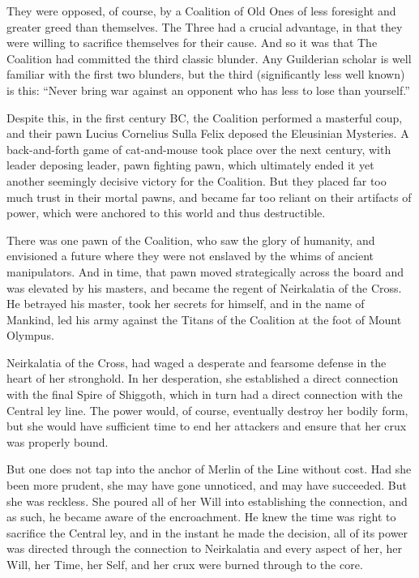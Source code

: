 They were opposed, of course, by a Coalition of Old Ones of less foresight and greater greed than themselves. The Three had a crucial advantage, in that they were willing to sacrifice themselves for their cause. And so it was that The Coalition had committed the third classic blunder. Any Guilderian scholar is well familiar with the first two blunders, but the third (significantly less well known) is this: “Never bring war against an opponent who has less to lose than yourself.”

Despite this, in the first century BC, the Coalition performed a masterful coup, and their pawn Lucius Cornelius Sulla Felix deposed the Eleusinian Mysteries. A back-and-forth game of cat-and-mouse took place over the next century, with leader deposing leader, pawn fighting pawn, which ultimately ended it yet another seemingly decisive victory for the Coalition. But they placed far too much trust in their mortal pawns, and became far too reliant on their artifacts of power, which were anchored to this world and thus destructible.

There was one pawn of the Coalition, who saw the glory of humanity, and envisioned a future where they were not enslaved by the whims of ancient manipulators. And in time, that pawn moved strategically across the board and was elevated by his masters, and became the regent of Neirkalatia of the Cross. He betrayed his master, took her secrets for himself, and in the name of Mankind, led his army against the Titans of the Coalition at the foot of Mount Olympus.

Neirkalatia of the Cross, had waged a desperate and fearsome defense in the heart of her stronghold. In her desperation, she established a direct connection with the final Spire of Shiggoth, which in turn had a direct connection with the Central ley line. The power would, of course, eventually destroy her bodily form, but she would have sufficient time to end her attackers and ensure that her crux was properly bound.

But one does not tap into the anchor of Merlin of the Line without cost. Had she been more prudent, she may have gone unnoticed, and may have succeeded. But she was reckless. She poured all of her Will into establishing the connection, and as such, he became aware of the encroachment. He knew the time was right to sacrifice the Central ley, and in the instant he made the decision, all of its power was directed through the connection to Neirkalatia and every aspect of her, her Will, her Time, her Self, and her crux were burned through to the core.

